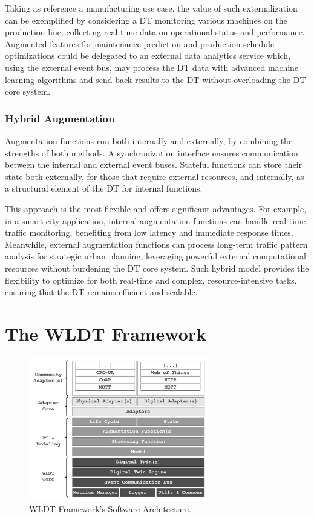 Taking as reference a manufacturing use case, the value of such externalization can be exemplified by considering a \ac{DT} monitoring various machines on the production line, collecting real-time data on operational status and performance.
Augmented features for maintenance prediction and production schedule optimizations could be delegated to an external data analytics service which, using the external event bus, may process the \ac{DT} data with advanced machine learning algorithms and send back results to the \ac{DT} without overloading the \ac{DT} core system.

\subsubsection{Hybrid Augmentation}
Augmentation functions run both internally and externally, by combining the strengths of both methods.
A synchronization interface ensures communication between the internal and external event buses.
%
Stateful functions can store their state both externally, for those that require external resources, and internally, as a structural element of the \ac{DT} for internal functions.

This approach is the most flexible and offers significant advantages.
For example, in a smart city application, internal augmentation functions can handle real-time traffic monitoring, benefiting from low latency and immediate response times.
Meanwhile, external augmentation functions can process long-term traffic pattern analysis for strategic urban planning, leveraging powerful external computational resources without burdening the \ac{DT} core system.
%
Such hybrid model provides the flexibility to optimize for both real-time and complex, resource-intensive tasks, ensuring that the \ac{DT} remains efficient and scalable.

\section{The \acl{WLDT} Framework}

\begin{figure}
    \centering
    \includegraphics[width=0.7\textwidth]{figures/wldt_architecture.pdf}
    \caption{WLDT Framework's Software Architecture.}
    \label{fig:wldt_architecture}
\end{figure}

